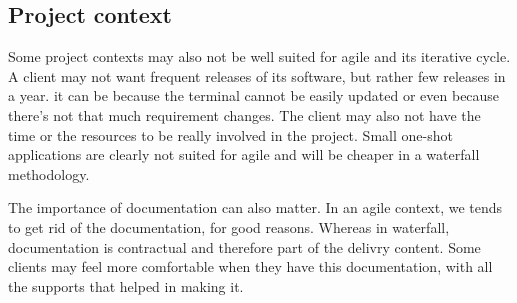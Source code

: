 \subsection{Project context}\label{subsec:project-context}
Some project contexts may also not be well suited for agile and its iterative cycle.
A client may not want frequent releases of its software, but rather few releases in a year.
it can be because the terminal cannot be easily updated or even because there's not that much requirement changes.
The client may also not have the time or the resources to be really involved in the project.
Small one-shot applications are clearly not suited for agile and will be cheaper in a waterfall methodology.
 
The importance of documentation can also matter.
In an agile context, we tends to get rid of the documentation, for good reasons.
Whereas in waterfall, documentation is contractual and therefore part of the delivry content.
Some clients may feel more comfortable when they have this documentation, with all the supports that helped in making it.
